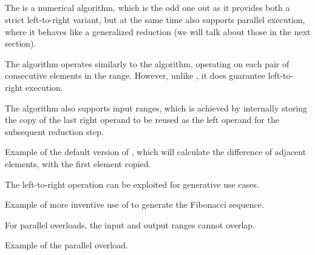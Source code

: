 \subsection{\texorpdfstring{}{\texttt{std::adjacent\_difference}}}

The  is a numerical algorithm, which is the odd one out as it provides both a strict left-to-right variant, but at the same time also supports parallel execution, where it behaves like a generalized reduction (we will talk about those in the next section).

The algorithm operates similarly to the  algorithm, operating on each pair of consecutive elements in the range. However, unlike , it does guarantee left-to-right execution.

The algorithm also supports input ranges, which is achieved by internally storing the copy of the last right operand to be reused as the left operand for the subsequent reduction step.


\begin{codebox}[]{\href{https://compiler-explorer.com/z/6vPea76qr}{\ExternalLink}}
\footnotesize Example of the default version of , which will calculate the difference of adjacent elements, with the first element copied.
\tcblower
{}
\end{codebox}

The left-to-right operation can be exploited for generative use cases.

\begin{codebox}[]{\href{https://compiler-explorer.com/z/fn18zEP4e}{\ExternalLink}}
\footnotesize Example of more inventive use of  to generate the Fibonacci sequence.
\tcblower
{}
\end{codebox}

For parallel overloads, the input and output ranges cannot overlap.

\begin{codebox}[]{\href{https://compiler-explorer.com/z/7hYj7qaTb}{\ExternalLink}}
\footnotesize Example of the parallel  overload.
\tcblower
{}
\end{codebox}
